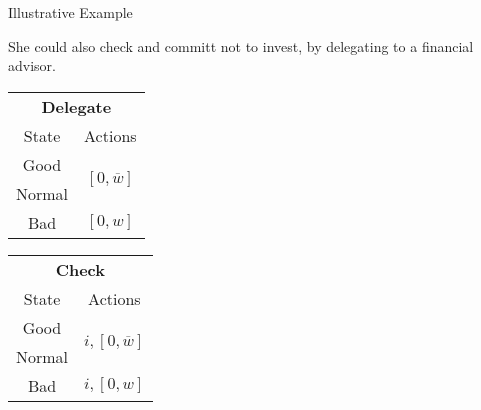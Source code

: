 \documentclass[usenames,dvipsnames,aspectratio=169,11pt, envcountsect]{beamer}
\begin{document}
\begin{frame}[noframenumbering]{Illustrative Example}

	She could also check and committ not to invest, by delegating to a financial advisor.

	\vfill

	\begin{table}[H]
		\centering
		\begin{minipage}{0.29\textwidth}
			\centering
			\begin{tabular}{c | c}
				\multicolumn{2}{c}{\textbf{Delegate}}                                                                     \\
				State                        & Actions                                                                    \\
				\hline
				{\color{bleudefrance}Good}   & \multirow{2}{*}{{\color{bleudefrance}\( \left[0, \overline{w} \right] \)}} \\
				{\color{bleudefrance}Normal} &                                                                            \\
				Bad                          & \( \left[0, w \right]\)                                                    \\
			\end{tabular}
			\vspace{0.5cm} %
		\end{minipage}\hspace{0.5cm} %
		\begin{minipage}{0.29\textwidth}
			\centering
			\begin{tabular}{c | c}
				\multicolumn{2}{c}{\textbf{Check}}                                                                            \\
				State                        & Actions                                                                        \\
				\hline
				{\color{bleudefrance}Good}   & \multirow{2}{*}{{\color{bleudefrance}\( i, \left[ 0, \overline{w} \right] \)}} \\
				{\color{bleudefrance}Normal} &                                                                                \\
				Bad                          & \(  i, \left[0, w \right] \)                                                   \\

\end{tabular}
\end{minipage}
\end{table}
\end{frame}
\end{document}
